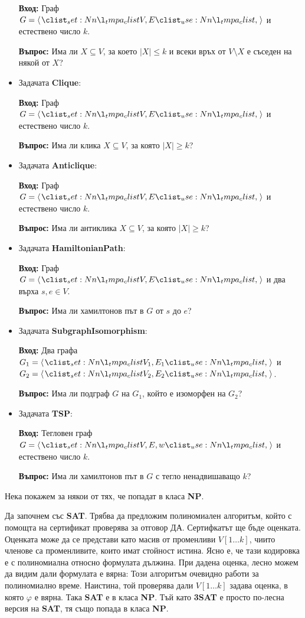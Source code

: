 \documentclass{article}
\theoremstyle{definition}
\theoremstyle{plain}
\theoremstyle{remark}
\theoremstyle{definition}
\begin{document}
\begin{itemize}
            \textbf{Вход:} Граф $G = \opair{V, E}$ и естествено число $k$.

            \textbf{Въпрос:} Има ли $X \subseteq V$, за което $|X| \leq k$ и всеки връх от $V \setminus X$ е съседен на някой от $X$?
      \item Задачата \textbf{Clique}:

            \textbf{Вход:} Граф $G = \opair{V, E}$ и естествено число $k$.

            \textbf{Въпрос:} Има ли клика $X \subseteq V$, за която $|X| \geq k$?
      \item Задачата \textbf{Anticlique}:

            \textbf{Вход:} Граф $G = \opair{V, E}$ и естествено число $k$.

            \textbf{Въпрос:} Има ли антиклика $X \subseteq V$, за която $|X| \geq k$?
      \item Задачата \textbf{HamiltonianPath}:

            \textbf{Вход:} Граф $G = \opair{V, E}$ и два върха $s, e \in V$.

            \textbf{Въпрос:} Има ли хамилтонов път в $G$ от $s$ до $e$?
      \item Задачата \textbf{SubgraphIsomorphism}:

            \textbf{Вход:} Два графа $G_1 = \opair{V_1, E_1}$ и $G_2 = \opair{V_2, E_2}$.

            \textbf{Въпрос:} Има ли подграф $G$ на $G_1$, който е изоморфен на $G_2$?
      \item Задачата \textbf{TSP}:

            \textbf{Вход:} Тегловен граф $G = \opair{V, E, w}$ и естествено число $k$.

            \textbf{Въпрос:} Има ли хамилтонов път в $G$ с тегло ненадвишаващо $k$?
\end{itemize}

Нека покажем за някои от тях, че попадат в класа \textbf{NP}.

Да започнем със \textbf{SAT}.
Трябва да предложим полиномиален алгоритъм, който с помощта на сертификат проверява за отговор ДА.
Сертифкатът ще бъде оценката.
Оценката може да се представи като масив от променливи $V[1 \dots k]$, чиито членове са променливите, които имат стойност истина.
Ясно е, че тази кодировка е с полиномиална относно формулата дължина.
При дадена оценка, лесно можем да видим дали формулата е вярна:
Този алгоритъм очевидно работи за полиномиално време.
Наистина, той проверява дали $V[1 \dots k]$ задава оценка, в която $\varphi$ е вярна.
Така \textbf{SAT} е в класа \textbf{NP}.
Тъй като \textbf{3SAT} е просто по-лесна версия на \textbf{SAT}, тя също попада в класа \textbf{NP}.
\end{document}
